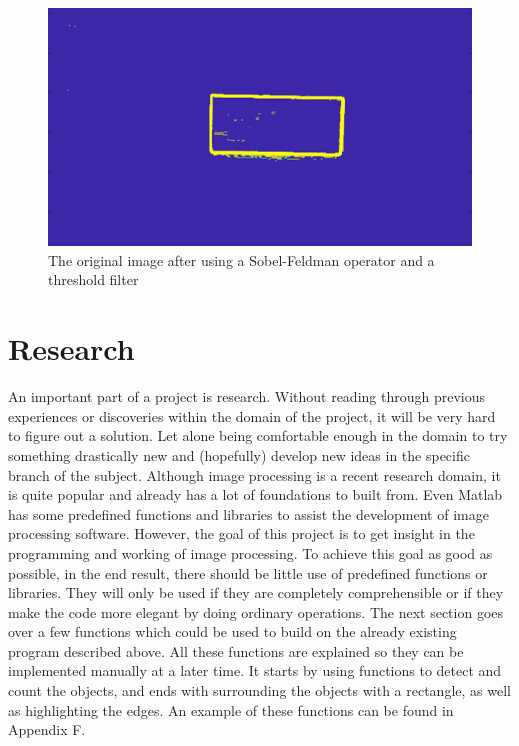 \documentclass{article}
\begin{document}
\begin{figure}[h]
	\center
  \includegraphics[width=0.6\linewidth]{sobel_and_threshold.png}
  \caption{The original image after using a Sobel-Feldman operator and a threshold filter}
  \label{fig:sobel_and_threshold}
\end{figure}

\section{Research}
An important part of a project is research. Without reading through previous experiences or discoveries within the domain of the project, it will be very hard to figure out a solution. Let alone being comfortable enough in the domain to try something drastically new and (hopefully) develop new ideas in the specific branch of the subject. Although image processing is a recent research domain, it is quite popular and already has a lot of foundations to built from. Even Matlab has some predefined functions and libraries to assist the development of image processing software.
However, the goal of this project is to get insight in the programming and working of image processing. To achieve this goal as good as possible, in the end result, there should be little use of predefined functions or libraries. They will only be used if they are completely comprehensible or if they make the code more elegant by doing ordinary operations. 
The next section goes over a few functions which could be used to build on the already existing program described above. All these functions are explained so they can be implemented manually at a later time. It starts by using functions to detect and count the objects, and ends with surrounding the objects with a rectangle, as well as highlighting the edges. An example of these functions can be found in Appendix F.
\end{document}

